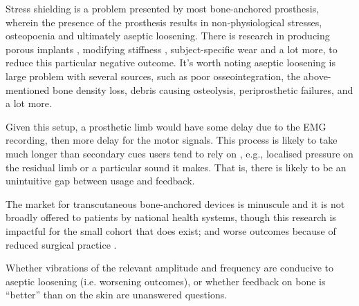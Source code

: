 Stress shielding is a problem presented by most bone-anchored prosthesis, wherein the presence of the prosthesis results in non-physiological stresses, osteopoenia and ultimately aseptic loosening.
There is research in producing porous implants \cite{DhandapaniRamya2020Amob}, modifying stiffness \cite{AhmedK.2020EVoa}, subject-specific wear and a lot more, to reduce this particular negative outcome.
It's worth noting aseptic loosening is large problem with several sources, such as poor osseointegration, the above-mentioned bone density loss, debris causing osteolysis, periprosthetic failures, and a lot more.

Given this setup, a prosthetic limb would have some delay due to the EMG recording, then more delay for the motor signals. This process is likely to take much longer than secondary cues users tend to rely on \cite{schofield_applications_2014}, e.g., localised pressure on the residual limb or a particular sound it makes.
That is, there is likely to be an unintuitive gap between usage and feedback.

The market for transcutaneous bone-anchored devices is minuscule and it is not broadly offered to patients by national health systems, though this research is impactful for the small cohort that does exist; and worse outcomes because of reduced surgical practice \cite{MaruthappuMahiben2015TIoV}.

Whether vibrations of the relevant amplitude and frequency are conducive to aseptic loosening (i.e. worsening outcomes), or whether feedback on bone is ``better'' than on the skin are unanswered questions.